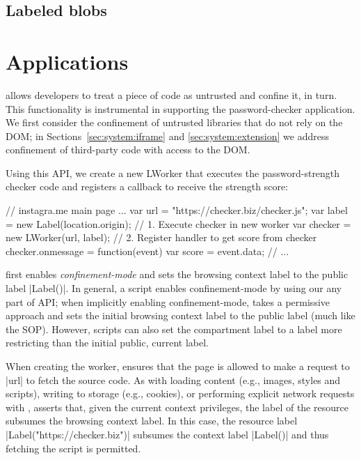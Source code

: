 \subsection{Labeled blobs}

\section{Applications}
\label{sec:system:worker}

%
%
%
\sys{} allows developers to treat a piece of code as untrusted and
confine it, in turn. This functionality is instrumental in supporting
the password-checker application.
%
We first consider the confinement of untrusted libraries that do not
rely on the DOM; in Sections~\ref{sec:system:iframe} and
\ref{sec:system:extension} we address confinement of third-party code
with access to the DOM.


Using this API, we create a new LWorker that executes the
password-strength checker code and registers a callback to receive the
strength score:
\begin{jscode}
// instagra.me main page ...
var url = "https://checker.biz/checker.js";
var label = new Label(location.origin);
// 1. Execute checker in new worker
var checker = new LWorker(url, label);
// 2. Register handler to get score from checker
checker.onmessage = function(event) {
  var score = event.data; 
  // ...
}
\end{jscode}
%
\sys{} first enables \emph{confinement-mode} and sets the browsing
context label to the public label \js|Label()|.
%
In general, a script enables confinement-mode by using our any part of
API; when implicitly enabling confinement-mode, \sys{} takes a
permissive approach and sets the initial browsing context label to the
public label (much like the SOP).
%
However, scripts can also set the compartment label to a label more
restricting than the initial public, current label.
 
When creating the worker, \sys{} ensures that the page is allowed to
make a request to \js|url| to fetch the source code.
%
As with loading content (e.g., images, styles and scripts), writing to
storage (e.g., cookies), or performing explicit network requests with
\xhr{}, \sys{} asserts that, given the current context privileges, the
label of the resource subsumes the browsing context label.
%
In this case, the resource label \js|Label("https://checker.biz")|
subsumes the context label \js|Label()| and thus fetching the script
is permitted.

